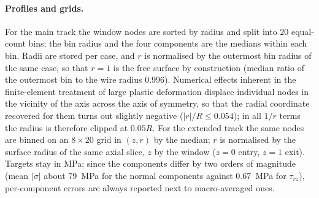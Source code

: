 \paragraph{Profiles and grids.}
For the main track the window nodes are sorted by radius and split into 20 equal-count bins; the bin radius and the four components are the medians within each bin. %
Radii are stored per case, and $r$ is normalised by the outermost bin radius of the same case, so that $r=1$ is the free surface by construction (median ratio of the outermost bin to the wire radius 0.996). %
Numerical effects inherent in the finite-element treatment of large plastic deformation displace individual nodes in the vicinity of the axis across the axis of symmetry, so that the radial coordinate recovered for them turns out slightly negative ($|r|/R \le 0.054$); in all $1/r$ terms the radius is therefore clipped at $0.05R$. %
For the extended track the same nodes are binned on an $8\times20$ grid in $(z,r)$ by the median; $r$ is normalised by the surface radius of the same axial slice, $z$ by the window ($z=0$ entry, $z=1$ exit). %
Targets stay in MPa; since the components differ by two orders of magnitude (mean $|\sigma|$ about 79~MPa for the normal components against 0.67~MPa for $\tau_{rz}$), per-component errors are always reported next to macro-averaged ones. %

